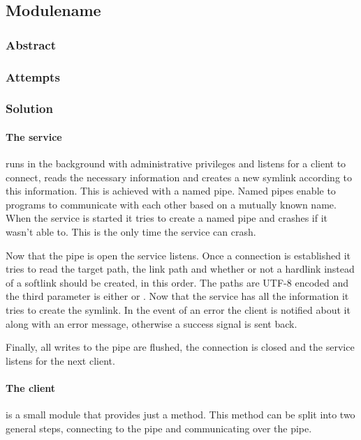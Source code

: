 \subsection{Modulename}
\def\kapitelautor{}

\subsubsection{Abstract}

\subsubsection{Attempts}

\subsubsection{Solution} %

\paragraph{The service} runs in the background with administrative privileges
and listens for a client to connect, reads the necessary information and
creates a new symlink according to this information. This is achieved with a
named pipe. Named pipes enable to programs to communicate with each other based
on a mutually known name. When the service is started it tries to create a
named pipe and crashes if it wasn't able to. This is the only time the service
can crash.

Now that the pipe is open the service listens. Once a connection is established
it tries to read the target path, the link path and whether or not a hardlink
instead of a softlink should be created, in this order. The paths are UTF-8
encoded and the third parameter is either  or .
Now that the service has all the information it tries to create the symlink. In
the event of an error the client is notified about it along with an error
message, otherwise a success signal is sent back.

Finally, all writes to the pipe are flushed, the connection is closed and the
service listens for the next client.

\paragraph{The client} is a small module that provides just a 
method. This method can be split into two general steps, connecting to the pipe
and communicating over the pipe.

